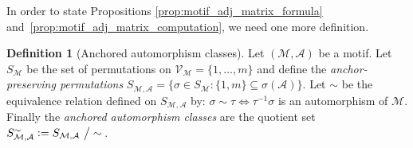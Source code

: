 \documentclass[12pt]{ociamthesis}
\theoremstyle{plain}
\theoremstyle{definition}
\newtheorem{definition}{Definition}[chapter]
\theoremstyle{remark}
\newcommand\ca[1]{\mathcal{#1}}
\begin{document}
In order to state Propositions \ref{prop:motif_adj_matrix_formula}
and~\ref{prop:motif_adj_matrix_computation}, we need one more definition.

\begin{definition}[Anchored automorphism classes]
Let $(\ca{M,A})$ be a motif.
Let $S_\ca{M}$ be the set of permutations on $ \ca{V_M} = \{ 1, \ldots, m \}$
and define the \emph{anchor-preserving permutations} $S_\ca{M,A} = \{ \sigma
\in S_\ca{M} : \{1,m\} \subseteq \sigma(\ca{A}) \}$.
Let $\sim$ be the equivalence relation defined on $S_\ca{M,A}$ by: $\sigma
\sim \tau \iff \tau^{-1} \sigma$ is an automorphism of $\ca{M}$.
Finally the \emph{anchored automorphism classes} are the quotient set
$S_\ca{M,A}^\sim \vcentcolon= S_\ca{M,A} \ \big/ \sim$\,.
\end{definition}
\end{document}
